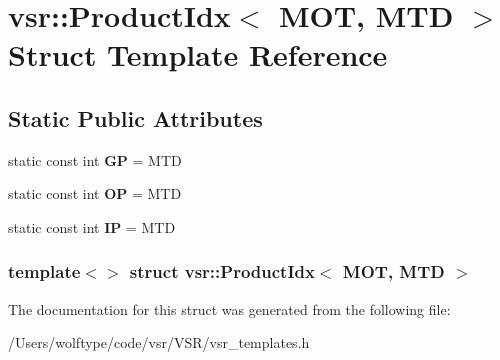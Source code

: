 \hypertarget{structvsr_1_1_product_idx_3_01_m_o_t_00_01_m_t_d_01_4}{\section{vsr\-:\-:Product\-Idx$<$ M\-O\-T, M\-T\-D $>$ Struct Template Reference}
\label{structvsr_1_1_product_idx_3_01_m_o_t_00_01_m_t_d_01_4}
}
\subsection*{Static Public Attributes}
\begin{DoxyCompactItemize}
\item 
\hypertarget{structvsr_1_1_product_idx_3_01_m_o_t_00_01_m_t_d_01_4_ad9245963e6b016fdec4d2805f9c182ee}{static const int {\bfseries G\-P} = M\-T\-D}\label{structvsr_1_1_product_idx_3_01_m_o_t_00_01_m_t_d_01_4_ad9245963e6b016fdec4d2805f9c182ee}

\item 
\hypertarget{structvsr_1_1_product_idx_3_01_m_o_t_00_01_m_t_d_01_4_ad23b6a81c27743bc163d372f7a92a800}{static const int {\bfseries O\-P} = M\-T\-D}\label{structvsr_1_1_product_idx_3_01_m_o_t_00_01_m_t_d_01_4_ad23b6a81c27743bc163d372f7a92a800}

\item 
\hypertarget{structvsr_1_1_product_idx_3_01_m_o_t_00_01_m_t_d_01_4_a103481de28f2d5892de3991e25d3b5ab}{static const int {\bfseries I\-P} = M\-T\-D}\label{structvsr_1_1_product_idx_3_01_m_o_t_00_01_m_t_d_01_4_a103481de28f2d5892de3991e25d3b5ab}

\end{DoxyCompactItemize}
\subsubsection*{template$<$$>$ struct vsr\-::\-Product\-Idx$<$ M\-O\-T, M\-T\-D $>$}



The documentation for this struct was generated from the following file\-:\begin{DoxyCompactItemize}
\item 
/\-Users/wolftype/code/vsr/\-V\-S\-R/vsr\-\_\-templates.\-h\end{DoxyCompactItemize}
